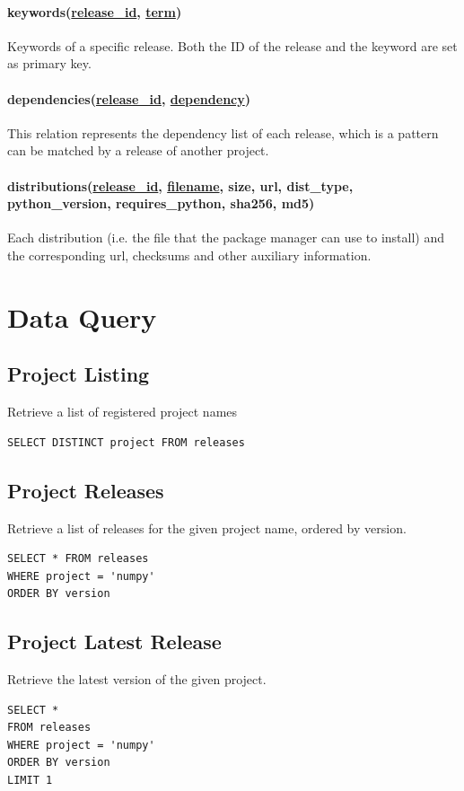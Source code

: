 \documentclass[a4paper,12pt]{article}
\newcommand{\id}[1]{\underline{#1\_id}}
\begin{document}
\paragraph{keywords(\id{release}, \underline{term})} Keywords of a specific
release.  Both the ID of the release and the keyword are set as primary key.

\paragraph{dependencies(\id{release}, \underline{dependency})} This relation
represents the dependency list of each release, which is a pattern can be
matched by a release of another project.

\paragraph{distributions(\id{release}, \underline{filename}, size, url,
dist\_type, python\_version, requires\_python, sha256, md5)}
Each distribution (i.e. the file that the package manager can use to install)
and the corresponding url, checksums and other auxiliary information.

\section{Data Query}
\subsection{Project Listing}
Retrieve a list of registered project names
\begin{verbatim}
SELECT DISTINCT project FROM releases
\end{verbatim}

\subsection{Project Releases}
Retrieve a list of releases for the given project name, ordered by version.
\begin{verbatim}
SELECT * FROM releases
WHERE project = 'numpy'
ORDER BY version
\end{verbatim}

\subsection{Project Latest Release}
Retrieve the latest version of the given project.
\begin{verbatim}
SELECT *
FROM releases
WHERE project = 'numpy'
ORDER BY version
LIMIT 1
\end{verbatim}
\end{document}
